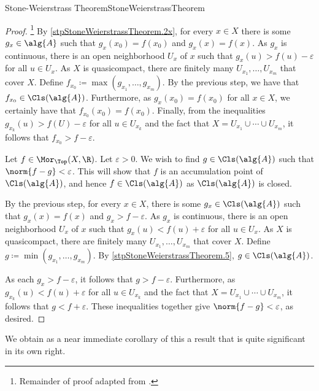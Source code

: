 \begin{thm}{Stone-Weierstrass Theorem}{StoneWeierstrassTheorem}
\begin{proof}
\footnote{Remainder of proof adapted from \cite[Theorem 7.32]{Rudin}.}
By \cref{stpStoneWeierstrassTheorem.2x}, for every $x\in X$ there is some $g_x\in \alg{A}$ such that $g_x(x_0)=f(x_0)$ and $g_x(x)=f(x)$.  As $g_x$ is continuous, there is an open neighborhood $U_x$ of $x$ such that $g_x(u)>f(u)-\varepsilon$ for all $u\in U_x$.  As $X$ is quasicompact, there are finitely many $U_{x_1},\ldots ,U_{x_m}$ that cover $X$.  Define $f_{x_0}\coloneqq \max (g_{x_1},\ldots ,g_{x_m})$.  By the previous step, we have that $f_{x_0}\in \Cls (\alg{A})$.  Furthermore, as $g_x(x_0)=f(x_0)$ for all $x\in X$, we certainly have that $f_{x_0}(x_0)=f(x_0)$.  Finally, from the inequalities $g_{x_k}(u)>f(U)-\varepsilon$ for all $u\in U_{x_k}$ and the fact that $X=U_{x_1}\cup \cdots \cup U_{x_m}$, it follows that $f_{x_0}>f-\varepsilon$.

Let $f\in \Mor _{\Top}(X,\R )$.  Let $\varepsilon >0$.  We wish to find $g\in \Cls (\alg{A})$ such that $\norm{f-g}<\varepsilon$.  This will show that $f$ is an accumulation point of $\Cls (\alg{A})$, and hence $f\in \Cls (\alg{A})$ as $\Cls (\alg{A})$ is closed.

By the previous step, for every $x\in X$, there is some $g_x\in \Cls (\alg{A})$ such that $g_x(x)=f(x)$ and $g_x>f-\varepsilon$.  As $g_x$ is continuous, there is an open neighborhood $U_x$ of $x$ such that $g_x(u)<f(u)+\varepsilon$ for all $u\in U_x$.  As $X$ is quasicompact, there are finitely many $U_{x_1},\ldots ,U_{x_m}$ that cover $X$.  Define $g\coloneqq \min (g_{x_1},\ldots ,g_{x_m})$.  By \cref{stpStoneWeierstrassTheorem.5}, $g\in \Cls (\alg{A})$.

As each $g_x>f-\varepsilon$, it follows that $g>f-\varepsilon$.  Furthermore, as $g_{x_k}(u)<f(u)+\varepsilon$ for all $u\in U_{x_k}$ and the fact that $X=U_{x_1}\cup \cdots \cup U_{x_m}$, it follows that $g<f+\varepsilon$.  These inequalities together give $\norm{f-g}<\varepsilon$, as desired.
\end{proof}
\end{thm}
We obtain as a near immediate corollary of this a result that is quite significant in its own right.
